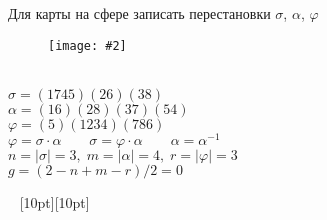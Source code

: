 \documentclass[a4paper,12pt]{article}
\numberwithin{figure}{section}
\newcommand\CenterFigure[2]{
	\begin{figure}[H]
		\centering
		\texttt{[image: \#2]}
	\end{figure}
}
\begin{document}
\begin{problem}
	Для карты на сфере записать перестановки $\sigma$, $\alpha$, $\varphi$
		\CenterFigure{6cm}{permutations-on-sphere.png}
\end{problem}
\begin{solution}
	\ \\
	$\sigma = (1 7 4 5) (2 6) (3 8)$ \\
	$\alpha = (1 6) (2 8) (3 7) (5 4)$ \\
	$\varphi = (5) (1 2 3 4) (7 8 6)$ \\
	$\varphi = \sigma \cdot \alpha \qquad \sigma = \varphi \cdot \alpha \qquad \alpha = \alpha^{-1}$ \\
	$n=|\sigma|=3 ,\; m=|\alpha|=4 ,\; r=|\varphi|=3$ \\
	$g = (2-n+m-r)/2 = 0$  
\end{solution}



\vspace{48pt} \noindent \hrulefill~ \raisebox{-8pt}[10pt][10pt]{\Huge{}}~ \hrulefill
\end{document}

